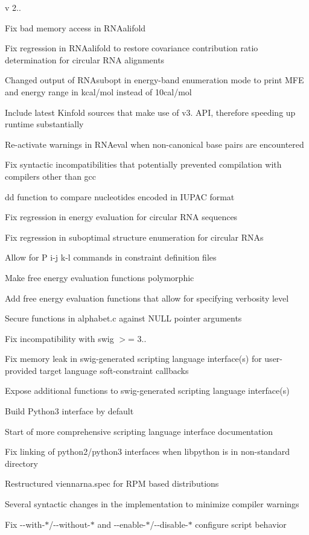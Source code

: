 v 2..
\begin{DoxyItemize}
\item Fix bad memory access in R\+N\+Aalifold
\item Fix regression in R\+N\+Aalifold to restore covariance contribution ratio determination for circular R\+NA alignments
\item Changed output of R\+N\+Asubopt in energy-\/band enumeration mode to print M\+FE and energy range in kcal/mol instead of 10cal/mol
\item Include latest Kinfold sources that make use of v3. A\+PI, therefore speeding up runtime substantially
\item Re-\/activate warnings in R\+N\+Aeval when non-\/canonical base pairs are encountered
\item Fix syntactic incompatibilities that potentially prevented compilation with compilers other than gcc
\item dd function to compare nucleotides encoded in I\+U\+P\+AC format
\item Fix regression in energy evaluation for circular R\+NA sequences
\item Fix regression in suboptimal structure enumeration for circular R\+N\+As
\item Allow for P i-\/j k-\/l commands in constraint definition files
\item Make free energy evaluation functions polymorphic
\item Add free energy evaluation functions that allow for specifying verbosity level
\item Secure functions in alphabet.\+c against N\+U\+LL pointer arguments
\item Fix incompatibility with swig $>$= 3..
\item Fix memory leak in swig-\/generated scripting language interface(s) for user-\/provided target language soft-\/constraint callbacks
\item Expose additional functions to swig-\/generated scripting language interface(s)
\item Build Python3 interface by default
\item Start of more comprehensive scripting language interface documentation
\item Fix linking of python2/python3 interfaces when libpython is in non-\/standard directory
\item Restructured viennarna.\+spec for R\+PM based distributions
\item Several syntactic changes in the implementation to minimize compiler warnings
\item Fix -\/-\/with-\/$\ast$/-\/-\/without-\/$\ast$ and -\/-\/enable-\/$\ast$/-\/-\/disable-\/$\ast$ configure script behavior
\end{DoxyItemize}

